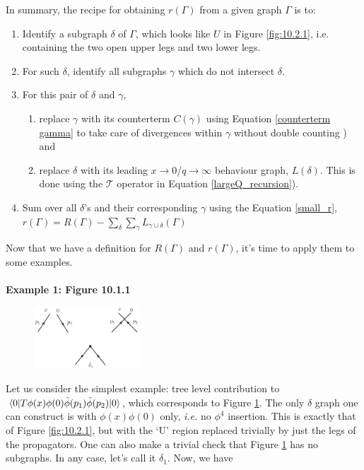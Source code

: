 \documentclass{article}
\begin{document}
In summary, the recipe for obtaining $r(\Gamma)$ from a given graph $\Gamma$ is to:
\begin{enumerate}
    \item Identify a subgraph $\delta$ of $\Gamma$, which looks like $U$ in Figure \ref{fig:10.2.1}, i.e. containing the two open upper legs and two lower legs.
    \item For such $\delta$, identify all subgraphs $\gamma$ which do not intersect $\delta$.
    \item For this pair of $\delta$ and $\gamma$, 
    \begin{enumerate}
        \item replace $\gamma$ with its counterterm $C(\gamma)$ using Equation \ref{counterterm gamma} to take care of divergences within $\gamma$ without double counting ) and
        \item replace $\delta$ with its leading $x \rightarrow 0$/$q \rightarrow \infty$ behaviour graph, $L(\delta)$. This is done using the $\mathcal{T}$ operator in Equation \ref{largeQ_recursion}).
    \end{enumerate}
    \item Sum over all $\delta$'s and their corresponding $\gamma$ using the Equation \ref{small_r}, $r(\Gamma) = R(\Gamma) - \sum_\delta \sum_\gamma L_{\gamma \cup \delta}(\Gamma)$
\end{enumerate}


Now that we have a definition for $R(\Gamma)$ and $r(\Gamma)$, it's time to apply them to some examples.\\ \\

\noindent\textbf{Example 1: Figure 10.1.1}\\

\begin{figure}[H]
\centering
\includegraphics[width=0.35\textwidth]{Graphs/Fig1011.eps} 
\caption{}
\label{fig:example1}
\end{figure}
Let us consider the simplest example: tree level contribution to $\mel{0}{T\phi(x)\phi(0)\Tilde{\phi}(p_1)\Tilde{\phi}(p_2)}{0}$, which corresponds to Figure \ref{fig:example1}. The only $\delta$ graph one can construct is with $\phi(x)\phi(0)$ only, \textit{i.e.} no $\phi^4$ insertion. This is exactly that of Figure \ref{fig:10.2.1}, but with the `U' region replaced trivially by just the legs of the propagators. One can also make a trivial check that Figure \ref{fig:example1} has no subgraphs. In any case, let's call it $\delta_1$. Now, we have
\end{document}
